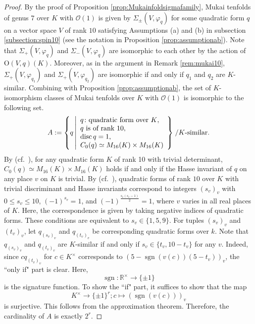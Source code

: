 \documentclass[autodetect-engine, a4paper]{amsart}
\theoremstyle{definition}
\def\cO{\mathcal{O}}
\def\R{\mathbb R}
\DeclareMathOperator\sgn{\mathrm{sgn}}
\DeclareMathOperator\disc{\mathrm{disc}}
\begin{document}
\begin{proof}
By the proof of Proposition \ref{prop:Mukainfoldsigmafamily}, Mukai tenfolds of genus $7$ over $K$ with $\cO(1)$ is given by $\Sigma_{\pm} (V, \varphi_{q})$ for some quadratic form $q$ on a vector space $V$ of rank $10$ satisfying Assumptions (a) and (b) in subsection \ref{subsection:spin10} (see the notation in Proposition \ref{prop:assumptionab}).
Note that $\Sigma_{+} (V, \varphi_{q})$ and $\Sigma_{-} (V,\varphi_{q})$ are isomorphic to each other by the action of $\mathrm{O} (V,q) (K)$. 
Moreover, as in the argument in Remark \ref{rem:mukai10}, $\Sigma_{+} (V, \varphi_{q_{1}})$ and $\Sigma_{+} (V, \varphi_{q_{2}})$ are isomorphic if and only if $q_{1}$ and $q_{2}$ are $K$-similar.
Combining with Proposition \ref{prop:assumptionab},
the set of $K$-isomorphism classes of Mukai tenfolds over $K$ with $\cO(1)$ is isomorphic to the following set.
\[
A:=
\left\{
q 
\left| 
\begin{array}{l}
q \colon 
\textup{quadratic form over $K$}, \\
q \textup{ is of rank $10$},\\
\disc q  = 1,\\
C_{0}(q) \simeq M_{16} (K) \times M_{16} (K)
\end{array}
\right\}\right.
/ K\textup{-similar}.
\]
By \cite[Chapter V, Proposition 3.20]{Lam} (cf.\ \cite[Chapter V, Theorem 2.5 and (3.12)]{Lam}), for any quadratic form $K$ of rank 10 with trivial determinant, $C_{0}(q) \simeq M_{16} (K) \times M_{16} (K)$ holds if and only if the Hasse invariant of $q$ on any place $v$ on $K$ is trivial.
By \cite[Theorem 72:1]{OMeara} (cf.\ \cite[Remark 66:5]{OMeara}), quadratic forms of rank $10$ over $K$ with trivial discriminant and Hasse invariants correspond to integers $(s_{v})_{v}$ with $0 \leq s_{v} \leq 10$, $(-1)^{s_{v}} =1$, and $(-1)^{\frac{s_{v}(s_{v}-1)}{2}} =1$, where $v$ varies in all real places of $K$.
Here, the correspondence is given by taking negative indices of quadratic forms.
These conditions are equivalent to $s_{v} \in \{1,5,9 \}$.
For tuples $(s_{v})_{v}$ and $(t_{v})_{v}$,
let $q_{(s_{v})_{v}}$ and $q_{(t_{v})_{v}}$ be corresponding quadratic forms over $k$.
Note that $q_{(s_{v})_{v}}$ and $q_{(t_{v})_{v}}$ are $K$-similar if and only if $s_{v} \in \{t_{v}, 10-t_{v}\}$ for any $v$.
Indeed, since $c q_{(t_{v})_{v}}$ for $c \in K^{\times}$ corresponds to 
$(5- \sgn (v(c))(5- t_{v}))_{v}$, the ``only if" part is clear.
Here, 
\[
\sgn \colon \R^{\times} \rightarrow \{\pm 1\}
\]
is the signature function.
To show the ``if" part, it suffices to show that the map
\[
K^{\times} \rightarrow \{\pm 1 \}^{r} ; c \mapsto (\sgn (v(c)))_{v}
\]
is surjective. This follows from the approximation theorem.
Therefore, the cardinality of $A$ is exactly $2^r$.
\end{proof}
\end{document}
